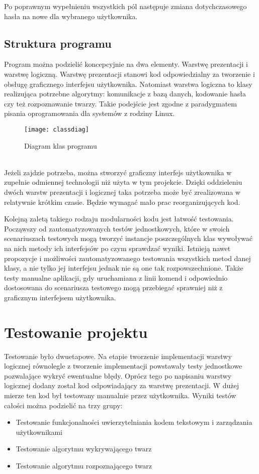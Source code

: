 \documentclass[eng,printmode]{mgr}
\begin{document}
Po poprawnym wypełnieniu wszystkich pól następuje zmiana dotychczasowego hasła na nowe dla wybranego użytkownika.
\section{Struktura programu}
Program można podzielić koncepcyjnie na dwa elementy. Warstwę prezentacji i warstwę logiczną. Warstwę prezentacji stanowi kod odpowiedzialny za tworzenie i obsługę graficznego interfejsu użytkownika. Natomiast warstwa logiczna to klasy realizująca potrzebne algorytmy: komunikacje z bazą danych, kodowanie hasła czy też rozpoznawanie twarzy. Takie podejście jest zgodne z paradygmatem pisania oprogramowania dla systemów z rodziny Linux.\\
\begin{figure}[placement h]
\texttt{[image: classdiag]}
\caption{Diagram klas programu}
\end{figure}\\
Jeżeli zajdzie potrzeba, można stworzyć graficzny interfejs użytkownika w zupełnie odmiennej technologii niż użyta w tym projekcie. Dzięki oddzieleniu dwóch warstw prezentacji i logicznej taka potrzeba może być zrealizowana w relatywnie krótkim czasie. Będzie wymagać mało prac reorganizujących kod.

Kolejną zaletą takiego rodzaju modularności kodu jest łatwość testowania. Począwszy od zautomatyzowanych testów jednostkowych, które w swoich scenariuszach testowych mogą tworzyć instancje poszczególnych klas wywoływać na nich metody ich interfejsów po czym sprawdzać wyniki. Istnieją nawet propozycje i możliwości zautomatyzowanego testowania wszystkich metod danej klasy, a nie tylko jej interfejsu jednak nie są one tak rozpowszechnione. Także testy manualne aplikacji, gdy uruchamiana z linii komend i odpowiednio dostosowana do scenariusza testowego mogą przebiegać sprawniej niż z graficznym interfejsem użytkownika.

\chapter{Testowanie projektu}

Testowanie było dwuetapowe. Na etapie tworzenie implementacji warstwy logicznej równolegle z tworzenie implementacji powstawały testy jednostkowe pozwalające wykryć ewentualne błędy. Oprócz tego po napisaniu warstwy logicznej dodany został kod odpowiadający za warstwę prezentacji. W dużej mierze ten kod był testowany manualnie przez użytkownika. Wyniki testów całości można podzielić na trzy grupy:
\begin{itemize}
\item{Testowanie funkcjonalności uwierzytelniania kodem tekstowym i zarządzania użytkownikami}
\item{Testowanie algorytmu wykrywającego twarz}
\item{Testowanie algorytmu rozpoznającego twarz}
\end{itemize}
\end{document}
